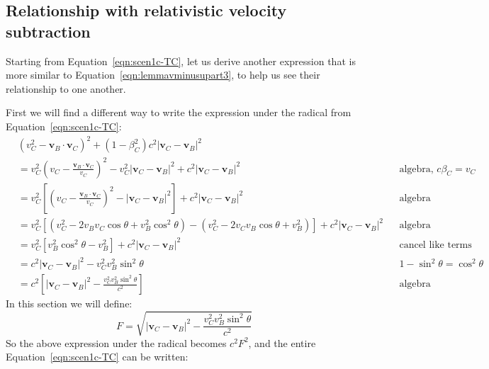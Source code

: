 \documentclass[a4paper]{article}
\theoremstyle{plain}
\theoremstyle{definition}
\newcommand{\vect}[1]{\mathbf{#1}}
\begin{document}
\subsection{Relationship with relativistic velocity subtraction}
\label{app:scen1c-Bsending-relvel}

Starting from Equation~\eqref{eqn:scen1c-TC}, let us derive another
expression that is more similar to
Equation~\eqref{eqn:lemmavminusupart3}, to help us see their
relationship to one another.

First we will find a different way to write the expression under the
radical from Equation~\eqref{eqn:scen1c-TC}:
\begin{align}
  & (v_C^2 - \vect{v}_B \cdot \vect{v}_C)^2  + (1-\beta_C^2)c^2 |\vect{v}_C - \vect{v}_B|^2 \nonumber \\
  & = v_C^2 (v_C - \frac{\vect{v}_B \cdot \vect{v}_C}{v_C})^2  - v_C^2 |\vect{v}_C - \vect{v}_B|^2 + c^2 |\vect{v}_C - \vect{v}_B|^2 & & \text{algebra, $c \beta_C = v_C$} \nonumber \\
  & = v_C^2 \left[ (v_C - \frac{\vect{v}_B \cdot \vect{v}_C}{v_C})^2  - |\vect{v}_C - \vect{v}_B|^2 \right] + c^2 |\vect{v}_C - \vect{v}_B|^2 & & \text{algebra} \nonumber \\
  & = v_C^2 \left[ (v_C^2 - 2 v_B v_C \cos \theta + v_B^2 \cos^2 \theta)  - (v_C^2 - 2 v_C v_B \cos \theta + v_B^2) \right] + c^2 |\vect{v}_C - \vect{v}_B|^2 & & \text{algebra} \nonumber \\
  & = v_C^2 \left[ v_B^2 \cos^2 \theta  - v_B^2 \right] + c^2 |\vect{v}_C - \vect{v}_B|^2 & & \text{cancel like terms} \nonumber \\
  & = c^2 |\vect{v}_C - \vect{v}_B|^2 - v_C^2 v_B^2 \sin^2 \theta & & \text{$1-\sin^2 \theta = \cos^2 \theta$} \nonumber \\
  & = c^2 \left[ |\vect{v}_C - \vect{v}_B|^2 - \frac{v_C^2 v_B^2 \sin^2 \theta}{c^2} \right] & & \text{algebra} \nonumber
\end{align}
In this section we will define:
\begin{equation}
F = \sqrt{ |\vect{v}_C - \vect{v}_B|^2 - \frac{v_C^2 v_B^2 \sin^2 \theta}{c^2} } \label{eqn:scen1c-F}
\end{equation}
So the above expression under the radical becomes $c^2 F^2$,
and the entire Equation~\eqref{eqn:scen1c-TC} can be written:
\end{document}
